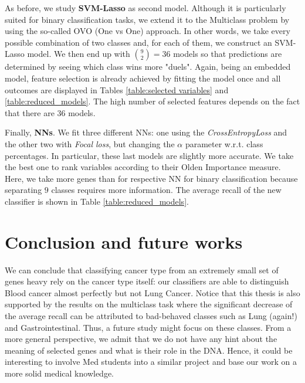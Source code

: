 \documentclass[a4paper,11pt, oneside]{article}  %
\begin{document}
As before, we study \textbf{SVM-Lasso} as second model.  Although it is particularly suited for binary classification tasks, we extend it to the Multiclass problem by using the so-called OVO (One vs One) approach. In other words, we take every possible combination of two classes and, for each of them, we construct an SVM-Lasso model. We then end up with $ \binom{9}{2} = 36$ models so that predictions are determined by seeing which class wins more "duels". Again,  being an embedded model, feature selection is already achieved by fitting the model once and all outcomes are displayed in Tables \ref{table:selected variables} and \ref{table:reduced_models}. The high number of selected features depends on the fact that there are 36 models.  

Finally, \textbf{NNs}. We fit three different NNs: one using the \textit{CrossEntropyLoss} and the other two with \textit{Focal loss}, but changing the $\alpha$ parameter w.r.t. class percentages. In particular, these last models are slightly more accurate. We take the best one to rank variables according to their Olden Importance measure. Here, we take more genes than for respective NN for binary classification because separating $9$ classes requires more information. The average recall of the new classifier is shown in Table \ref*{table:reduced_models}.


\section{Conclusion and future works}
We can conclude that classifying cancer type from an extremely small set of genes heavy rely on the cancer type itself: our classifiers are able to distinguish Blood cancer almost perfectly but not Lung Cancer. Notice that this thesis is also supported by the results on the multiclass task where the significant decrease of the average recall can be attributed to bad-behaved classes such as Lung (again!) and Gastrointestinal.  Thus,  a future study might focus on these classes. 
From a more general perspective,  we admit that we do not have any hint about the meaning of selected genes and what is their role in the DNA.  Hence, it could be interesting to involve Med students into a similar project and base our work on a more solid medical knowledge.  
\end{document}
